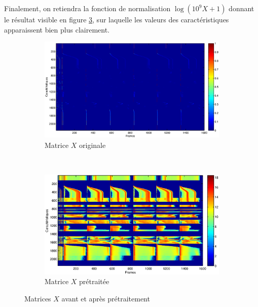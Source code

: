 
Finalement, on retiendra la fonction de normalisation $\log (10^9 X + 1)$ donnant le résultat visible en figure \ref{Xpreprocessed}, sur laquelle les valeurs des caractéristiques apparaissent bien plus clairement.

\begin{figure} [h]
\centering
	\begin{subfigure}[b]{0.6\textwidth}
		\includegraphics[width=\textwidth]{images/signal}
		\caption{Matrice $X$ originale}
		\label{Xorigin}
    \end{subfigure} \\
	\begin{subfigure}[b]{0.6\textwidth}
		\includegraphics[width=\textwidth]{images/signalPreprocessed}
		\caption{Matrice $X$ prétraitée}
		\label{Xpreprocessed}
    \end{subfigure}
    \caption{Matrices $X$ avant et après prétraitement}
\end{figure}

